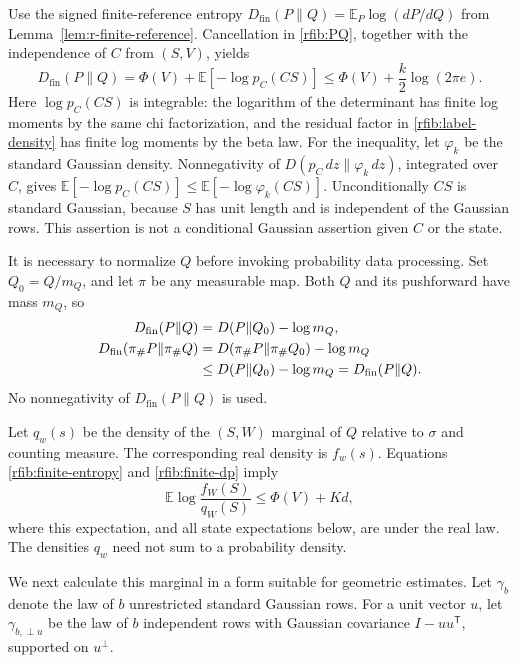 Use the signed finite-reference entropy
\(D_{\mathrm{fin}}(P\|Q)=\mathbb E_P\log(dP/dQ)\) from
Lemma~\ref{lem:r-finite-reference}.  Cancellation in
\eqref{rfib:PQ}, together with the independence of \(C\) from
\((S,V)\), yields
\begin{equation}\label{rfib:finite-entropy}
 D_{\mathrm{fin}}(P\|Q)=\Phi(V)+\mathbb E[-\log p_C(CS)]
 \le\Phi(V)+\frac{k}{2}\log(2\pi e).
\end{equation}
Here \(\log p_C(CS)\) is integrable: the logarithm of the determinant
has finite log moments by the same chi factorization, and the residual
factor in \eqref{rfib:label-density} has finite log moments by the beta
law.  For the inequality, let \(\varphi_k\) be the standard Gaussian
density.  Nonnegativity of \(D(p_C\,dz\|\varphi_k\,dz)\), integrated
over \(C\), gives
\(\mathbb E[-\log p_C(CS)]\le\mathbb E[-\log\varphi_k(CS)]\).
Unconditionally \(CS\) is standard Gaussian, because \(S\) has unit
length and is independent of the Gaussian rows.  This assertion is
not a conditional Gaussian assertion given \(C\) or the state.

It is necessary to normalize \(Q\) before invoking probability data
processing.  Set \(Q_0=Q/m_Q\), and let \(\pi\) be any measurable
map.  Both \(Q\) and its pushforward have mass \(m_Q\), so
\begin{align}
 D_{\mathrm{fin}}(P\|Q)&=D(P\|Q_0)-\log m_Q, \notag\\
 D_{\mathrm{fin}}(\pi_\#P\|\pi_\#Q)
   &=D(\pi_\#P\|\pi_\#Q_0)-\log m_Q \notag\\
   &\le D(P\|Q_0)-\log m_Q
     =D_{\mathrm{fin}}(P\|Q).                         \label{rfib:finite-dp}
\end{align}
No nonnegativity of \(D_{\mathrm{fin}}(P\|Q)\) is used.

Let \(q_w(s)\) be the density of the \((S,W)\) marginal of \(Q\)
relative to \(\sigma\) and counting measure.  The corresponding real
density is \(f_w(s)\).  Equations \eqref{rfib:finite-entropy} and
\eqref{rfib:finite-dp} imply
\begin{equation}\label{rfib:marginal-entropy}
 \mathbb E\log\frac{f_W(S)}{q_W(S)}
 \le\Phi(V)+Kd ,
\end{equation}
where this expectation, and all state expectations below, are under
the real law.  The densities \(q_w\) need not sum to a probability
density.

We next calculate this marginal in a form suitable for geometric
estimates.  Let \(\gamma_b\) denote the law of \(b\) unrestricted
standard Gaussian rows.  For a unit vector \(u\), let
\(\gamma_{b,\perp u}\) be the law of \(b\) independent rows with
Gaussian covariance \(I-uu^{\mathsf T}\), supported on \(u^\perp\).

